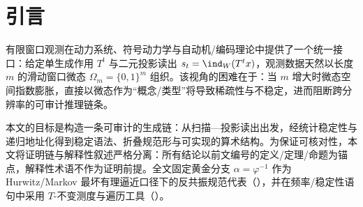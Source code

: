 \section{引言}\label{sec:introduction}

有限窗口观测在动力系统、符号动力学与自动机/编码理论中提供了一个统一接口：给定单生成作用 \(T^t\) 与二元投影读出 \(s_t=\ind_W(T^t x)\)，观测数据天然以长度 \(m\) 的滑动窗口微态 \(\Omega_m=\{0,1\}^m\) 组织。该视角的困难在于：当 \(m\) 增大时微态空间指数膨胀，直接以微态作为“概念/类型”将导致稀疏性与不稳定，进而阻断跨分辨率的可审计推理链条。
\par
本文的目标是构造一条可审计的生成链：从扫描—投影读出出发，经统计稳定性与递归地址化得到稳定语法、折叠规范形与可实现的算术结构。为保证可核对性，本文将证明链与解释性叙述严格分离：所有结论以前文编号的定义/定理/命题为锚点，解释性术语不作为证明前提。全文固定黄金分支 \(\alpha=\varphi^{-1}\) 作为 Hurwitz/Markov 最坏有理逼近口径下的反共振规范代表（\cite{Cassels1957,KuipersNiederreiter1974}），并在频率/稳定性语句中采用 \(T\)-不变测度与遍历工具（\cite{WaltersErgodicTheory}）。

